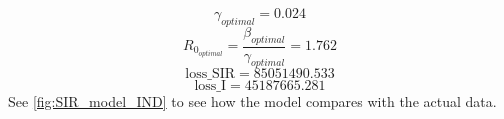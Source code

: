 \documentclass[tikz,fleqn,12pt]{wlscirep}
\begin{document}
\begin{equation}
  \gamma_{optimal} = 0.024
  \label{eq:gamma_optimal_without_lockdown}
\end{equation}
\begin{equation}
  R_{0_{optimal}} = \frac{\beta_{optimal}}{\gamma_{optimal}} = 1.762
  \label{eq:r0_without_lockdown}
\end{equation}
\begin{equation}
  \textrm{loss\_SIR} = 85051490.533
  \label{eq:cost_SIR_without_lockdown}
\end{equation}
\begin{equation}
  \textrm{loss\_I} = 45187665.281
  \label{eq:cost_I_without_lockdown}
\end{equation}
See \cref{fig:SIR_model_IND} to see how the model compares with the actual data.
\end{document}
